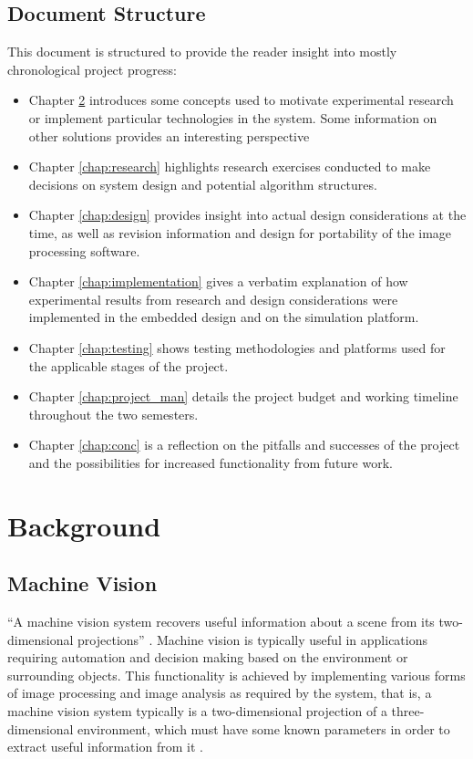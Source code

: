 \documentclass[11pt, a4paper, oneside]{Thesis} %
\begin{document}
\section{Document Structure}
This document is structured to provide the reader insight into mostly chronological project progress:
\begin{itemize}
\item Chapter \ref{chap:background} introduces some concepts used to motivate experimental research or implement particular technologies in the system. Some information on other solutions provides an interesting perspective
\item Chapter \ref{chap:research} highlights research exercises conducted to make decisions on system design and potential algorithm structures.
\item Chapter \ref{chap:design} provides insight into actual design considerations at the time, as well as revision information and design for portability of the image processing software. 
\item Chapter \ref{chap:implementation} gives a verbatim explanation of how experimental results from research and design considerations were implemented in the embedded design and on the simulation platform.
\item Chapter \ref{chap:testing} shows testing methodologies and platforms used for the applicable stages of the project.
\item Chapter \ref{chap:project_man} details the project budget and working timeline throughout the two semesters.
\item Chapter \ref{chap:conc} is a reflection on the pitfalls and successes of the project and the possibilities for increased functionality from future work.
\end{itemize}  

\chapter{Background}
\label{chap:background}

\section{Machine Vision}\label{sec:machine_vision}
``A machine vision system recovers useful information about a scene from its two-dimensional projections'' \cite{jain1995machine}. Machine vision is typically useful in applications requiring automation and decision making based on the environment or surrounding objects. This functionality is achieved by implementing various forms of image processing and image analysis as required by the system, that is, a machine vision system typically is a two-dimensional projection of a three-dimensional environment, which must have some known parameters in order to extract useful information from it \cite{jain1995machine}.
\end{document}
